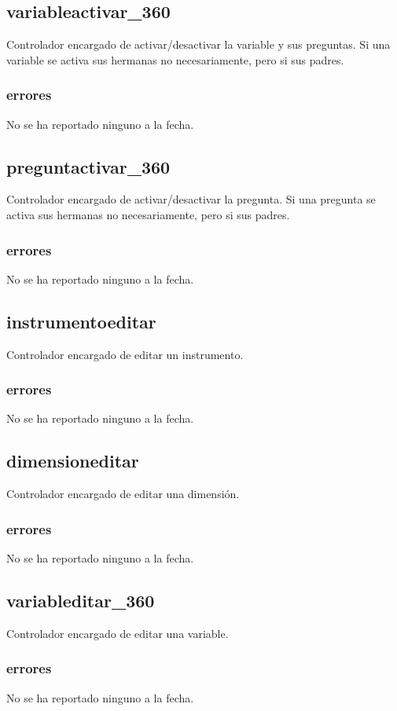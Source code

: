 \documentclass[10pt,a4paper]{book}
\begin{document}
	\subsection{variableactivar\_360}
	Controlador encargado de activar/desactivar la variable y sus preguntas. Si una variable se activa sus hermanas no necesariamente, pero si sus padres.
	\subsubsection{errores}
	No se ha reportado ninguno a la fecha.
	
	\subsection{preguntactivar\_360}
	Controlador encargado de activar/desactivar la pregunta. Si una pregunta se activa sus hermanas no necesariamente, pero si sus padres.
	\subsubsection{errores}
	No se ha reportado ninguno a la fecha.
	
	\subsection{instrumentoeditar}
	Controlador encargado de editar un instrumento.
	\subsubsection{errores}
	No se ha reportado ninguno a la fecha.
	
	\subsection{dimensioneditar}
	Controlador encargado de editar una dimensión.
	\subsubsection{errores}
	No se ha reportado ninguno a la fecha.
	
	\subsection{variableditar\_360}
	Controlador encargado de editar una variable.
	\subsubsection{errores}
	No se ha reportado ninguno a la fecha.
	
\end{document}
